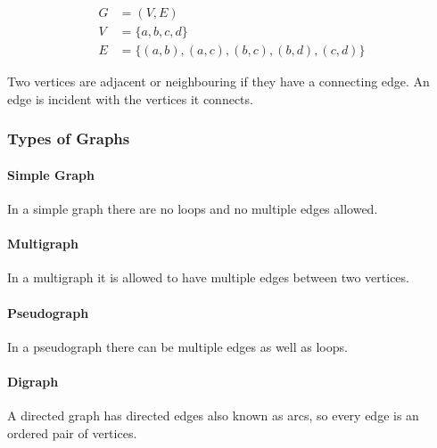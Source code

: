 \documentclass[a4paper, 10pt]{article}
\begin{document}
\begin{align*}
    G&=(V,E) \\
    V&=\{a,b,c,d\} \\
    E&=\{(a,b),(a,c),(b,c),(b,d),(c,d)\}
\end{align*}
\begin{center}
\end{center}
Two vertices are adjacent or neighbouring if they have a connecting edge. An edge is incident with the vertices it connects.
\subsubsection{Types of Graphs}
\paragraph{Simple Graph}
In a simple graph there are no loops and no multiple edges allowed.
\paragraph{Multigraph}
In a multigraph it is allowed to have multiple edges between two vertices.
\paragraph{Pseudograph}
In a pseudograph there can be multiple edges as well as loops.
\paragraph{Digraph}
A directed graph has directed edges also known as arcs, so every edge is an ordered pair of vertices.
\end{document}
